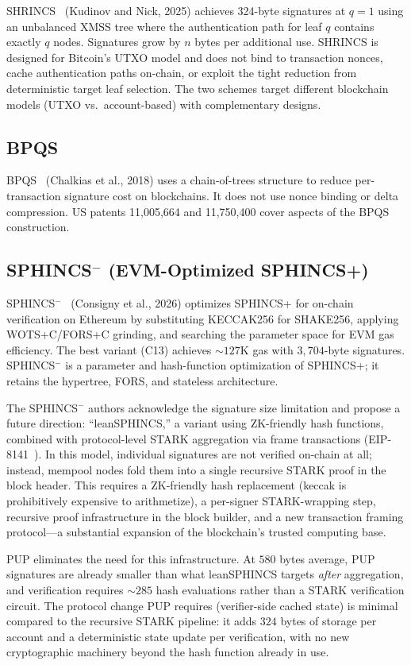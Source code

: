 \documentclass[11pt]{article}
\begin{document}
SHRINCS~\cite{shrincs} (Kudinov and Nick, 2025) achieves 324-byte
signatures at $q = 1$ using an unbalanced XMSS tree where the
authentication path for leaf $q$ contains exactly $q$ nodes. Signatures
grow by $n$ bytes per additional use. SHRINCS is designed for Bitcoin's
UTXO model and does not bind to transaction nonces, cache authentication
paths on-chain, or exploit the tight reduction from deterministic
target leaf selection. The two schemes target different blockchain models
(UTXO vs.\ account-based) with complementary designs.

\subsection{BPQS}

BPQS~\cite{bpqs} (Chalkias et al., 2018) uses a chain-of-trees
structure to reduce per-transaction signature cost on blockchains. It
does not use nonce binding or delta compression. US patents
11,005,664 and 11,750,400 cover aspects of the BPQS construction.

\subsection{SPHINCS$^-$ (EVM-Optimized SPHINCS+)}

SPHINCS$^-$~\cite{sphincsminus} (Consigny et al., 2026) optimizes
SPHINCS+ for on-chain verification on Ethereum by substituting
KECCAK256 for SHAKE256, applying WOTS+C/FORS+C grinding, and
searching the parameter space for EVM gas efficiency. The best variant
(C13) achieves ${\sim}127$K gas with $3{,}704$-byte signatures.
SPHINCS$^-$ is a parameter and hash-function optimization of SPHINCS+;
it retains the hypertree, FORS, and stateless architecture.

The SPHINCS$^-$ authors acknowledge the signature size limitation and
propose a future direction: ``leanSPHINCS,'' a variant using
ZK-friendly hash functions, combined with protocol-level STARK
aggregation via frame transactions (EIP-8141~\cite{eip8141}). In this
model, individual signatures are not verified on-chain at all; instead,
mempool nodes fold them into a single recursive STARK proof in the
block header. This requires a ZK-friendly hash replacement (keccak is
prohibitively expensive to arithmetize), a per-signer STARK-wrapping
step, recursive proof infrastructure in the block builder, and a new
transaction framing protocol---a substantial expansion of the
blockchain's trusted computing base.

PUP eliminates the need for this infrastructure. At $580$ bytes
average, PUP signatures are already smaller than what leanSPHINCS
targets \emph{after} aggregation, and verification requires
${\sim}285$ hash evaluations rather than a STARK verification circuit.
The protocol change PUP requires (verifier-side cached state) is
minimal compared to the recursive STARK pipeline: it adds $324$ bytes
of storage per account and a deterministic state update per
verification, with no new cryptographic machinery beyond the hash
function already in use.
\end{document}
